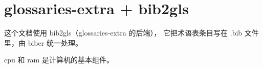 \documentclass{article}
\begin{document}
\section{glossaries-extra + bib2gls}

这个文档使用 bib2gls（glossaries-extra 的后端），
它把术语表条目写在 .bib 文件里，由 biber 统一处理。

\gls{cpu} 和 \gls{ram} 是计算机的基本组件。

\printglossary
\printbibliography
\end{document}
